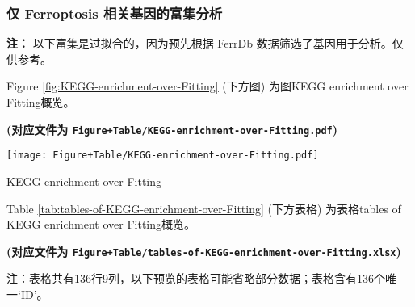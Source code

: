 \documentclass[
]{article}
\begin{document}
\hypertarget{ux4ec5-ferroptosis-ux76f8ux5173ux57faux56e0ux7684ux5bccux96c6ux5206ux6790}{%
\subsubsection{仅 Ferroptosis 相关基因的富集分析}\label{ux4ec5-ferroptosis-ux76f8ux5173ux57faux56e0ux7684ux5bccux96c6ux5206ux6790}}

\textbf{注：} 以下富集是过拟合的，因为预先根据 FerrDb 数据筛选了基因用于分析。仅供参考。

Figure \ref{fig:KEGG-enrichment-over-Fitting} (下方图) 为图KEGG enrichment over Fitting概览。

\textbf{(对应文件为 \texttt{Figure+Table/KEGG-enrichment-over-Fitting.pdf})}

\def\@captype{figure}
\begin{center}
\texttt{[image: Figure+Table/KEGG-enrichment-over-Fitting.pdf]}
\caption{KEGG enrichment over Fitting}\label{fig:KEGG-enrichment-over-Fitting}
\end{center}

Table \ref{tab:tables-of-KEGG-enrichment-over-Fitting} (下方表格) 为表格tables of KEGG enrichment over Fitting概览。

\textbf{(对应文件为 \texttt{Figure+Table/tables-of-KEGG-enrichment-over-Fitting.xlsx})}

\begin{center}\begin{tcolorbox}[colback=gray!10, colframe=gray!50, width=0.9\linewidth, arc=1mm, boxrule=0.5pt]注：表格共有136行9列，以下预览的表格可能省略部分数据；表格含有136个唯一`ID'。
\end{tcolorbox}
\end{center}
\end{document}
